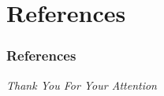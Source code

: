 \documentclass{beamer}
\begin{document}
\section{References}
\begin{frame}[allowframebreaks]
    \frametitle{References}
    \printbibliography
\end{frame}
\begin{frame}
  \centering \Large
  \emph{Thank You For Your Attention}
\end{frame}
\end{document}
